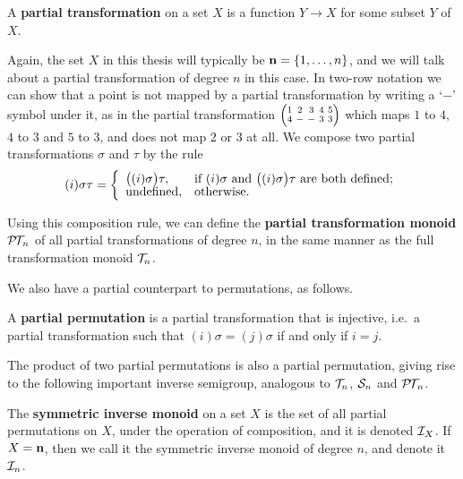 \begin{definition}
  \label{def:partial-transformation}
  A \textbf{partial transformation} on a set $X$ is a function $Y \to X$ for
  some subset $Y$ of $X$.
\end{definition}

Again, the set $X$ in this thesis will typically be $\mathbf{n} = \{1, \ldots, n\}$,
and we will talk about a partial transformation of degree $n$ in this case.  In
two-row notation we can show that a point is not mapped by a partial
transformation by writing a `$-$' symbol under it, as in the partial
transformation $\transV4--33$ which maps $1$ to $4$, $4$ to $3$ and $5$ to $3$,
and does not map $2$ or $3$ at all.  We compose two partial transformations
$\sigma$ and $\tau$ by the rule
$$(i)\sigma\tau = \left\{
  \begin{array}{l l}
    \big((i)\sigma\big)\tau,
    & \text{if~} (i)\sigma \text{~and~}
      \big((i)\sigma\big)\tau \text{~are both defined;} \\
    \text{undefined}, & \text{otherwise.}
  \end{array}
\right.$$

Using this composition rule, we can define the \textbf{partial
  transformation monoid} $\mathcal{P\!T\!}_n$ of all partial transformations of degree $n$,
in the same manner as the full transformation monoid $\mathcal{T}_n$.

We also have a partial counterpart to permutations, as follows.

\begin{definition}
  \label{def:partial-perm}
  A \textbf{partial permutation} is a partial transformation that is injective,
  i.e.~a partial transformation such that $(i)\sigma=(j)\sigma$ if and only if
  $i=j$.
\end{definition}

The product of two partial permutations is also a partial permutation, giving
rise to the following important inverse semigroup, analogous to $\mathcal{T}_n$, $\mathcal{S}_n$
and $\mathcal{P\!T\!}_n$.

\begin{definition}
  \label{def:in}
  The \textbf{symmetric inverse monoid} on a set $X$ is the set of all partial
  permutations on $X$, under the operation of composition, and it is denoted
  $\mathcal{I}_X$.  If $X = \mathbf{n}$, then we call it the symmetric inverse monoid of degree
  $n$, and denote it $\mathcal{I}_n$.
\end{definition}

